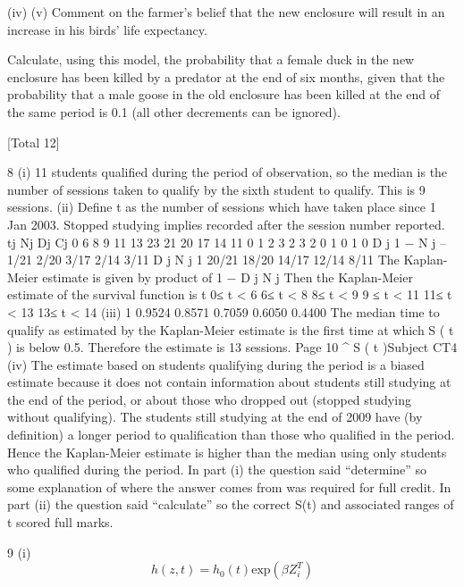 \documentclass[a4paper,12pt]{article}
\begin{document}
\begin{enumerate}
 
(iv)
(v)
Comment on the farmer’s belief that the new enclosure will result in an
increase in his birds’ life expectancy.
 
Calculate, using this model, the probability that a female duck in the new
enclosure has been killed by a predator at the end of six months, given that the
probability that a male goose in the old enclosure has been killed at the end of
the same period is 0.1 (all other decrements can be ignored).

[Total 12]



8
(i)
11 students qualified during the period of observation, so the median is the
number of sessions taken to qualify by the sixth student to qualify.
This is 9 sessions.
(ii)
Define t as the number of sessions which have taken place since 1 Jan 2003.
Stopped studying implies recorded after the session number reported.
tj Nj Dj Cj
0
6
8
9
11
13 23
21
20
17
14
11 0
1
2
3
2
3 2
0
1
0
1
0
D j
1 −
N j
–
1/21
2/20
3/17
2/14
3/11
D j
N j
1
20/21
18/20
14/17
12/14
8/11
The Kaplan-Meier estimate is given by product of 1 −
D j
N j
Then the Kaplan-Meier estimate of the survival function is
t
0≤ t < 6
6≤ t < 8
8≤ t < 9
9 ≤ t < 11
11≤ t < 13
13≤ t < 14
(iii)
1
0.9524
0.8571
0.7059
0.6050
0.4400
The median time to qualify as estimated by the Kaplan-Meier estimate
is the first time at which S ( t ) is below 0.5.
Therefore the estimate is 13 sessions.
Page 10
^
S ( t )Subject CT4 %
(iv)
The estimate based on students qualifying during the period
is a biased estimate because it does not contain information
about students still studying at the end of the period, or about
those who dropped out (stopped studying without qualifying).
The students still studying at the end of 2009 have (by definition) a longer
period to qualification than those who qualified in the period.
Hence the Kaplan-Meier estimate is higher than the median using
only students who qualified during the period.
In part (i) the question said “determine” so some explanation of where the answer comes
from was required for full credit. In part (ii) the question said “calculate” so the correct S(t)
and associated ranges of t scored full marks.
\newpage

9
(i)
\[ h(z,t) = h_0(t) \mbox{exp}(\beta Z_i^{T})\]


\end{enumerate}
\end{document}
